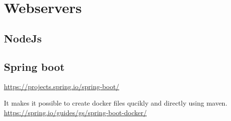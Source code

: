 \section{Webservers}

\subsection{NodeJs}
\label{sec:node}

\subsection{Spring boot}
\label{sec:spring}
\url{https://projects.spring.io/spring-boot/}

It makes it possible to create docker files qucikly and directly using maven.
\url{https://spring.io/guides/gs/spring-boot-docker/}